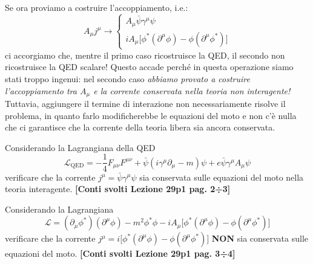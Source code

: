\documentclass[../main.tex]{subfiles}
\begin{document}
Se ora proviamo a costruire l'accoppiamento, i.e.:
\[
A_\mu j^\mu \rightarrow
\begin{cases}
    A_\mu\bar\psi\gamma^\mu\psi \\
    iA_\mu\big[ \phi^\ast(\partial^\mu\phi) - \phi(\partial^\mu\phi^\ast) \big] 
\end{cases}
\]
ci accorgiamo che, mentre il primo caso ricostruisce la QED, il secondo non ricostruisce la QED scalare! Questo accade perché in questa operazione siamo stati troppo ingenui: nel secondo caso \textit{abbiamo provato a costruire l'accoppiamento tra $A_\mu$ e la corrente conservata nella teoria non interagente!} Tuttavia, aggiungere il termine di interazione non necessariamente risolve il problema, in quanto farlo modificherebbe le equazioni del moto e non c'è nulla che ci garantisce che la corrente della teoria libera sia ancora conservata.

\begin{exercise}
    Considerando la Lagrangiana della QED
    \[
    \mathscr{L}_\text{QED} = -\frac{1}{4}F_{\mu\nu}F^{\mu\nu} + \bar\psi(i\gamma^\mu\partial_\mu - m)\psi + e\bar\psi\gamma^\mu A_\mu\psi
    \]
    verificare che la corrente $ j^\mu = \bar\psi\gamma^\mu\psi$ sia conservata sulle equazioni del moto nella teoria interagente. \textbf{[Conti svolti Lezione 29p1 pag. 2÷3]}
\end{exercise}


\begin{exercise}
    Considerando la Lagrangiana
    \[
    \mathscr{L} =(\partial_\mu\phi^\ast)(\partial^\mu\phi)-m^2\phi^\ast\phi - iA_\mu\big[ \phi^\ast(\partial^\mu\phi) - \phi(\partial^\mu\phi^\ast) \big]
    \]
    verificare che la corrente $ j^\mu = i\big[ \phi^\ast(\partial^\mu\phi) - \phi(\partial^\mu\phi^\ast) \big]$ \textbf{NON} sia conservata sulle equazioni del moto. \textbf{[Conti svolti Lezione 29p1 pag. 3÷4]}
\end{exercise}
\end{document}
